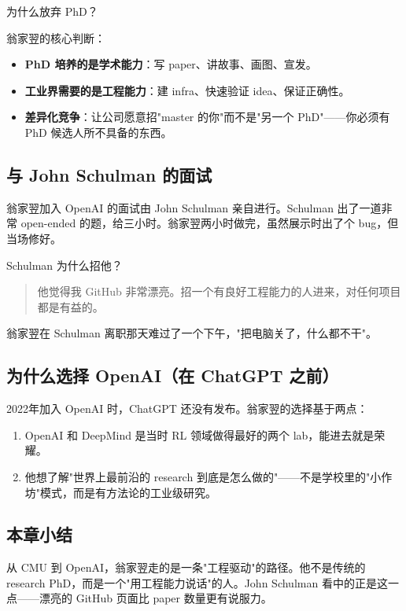 \documentclass[a4paper]{article}
\begin{document}
\begin{knowledgebox}{为什么放弃 PhD？}

翁家翌的核心判断：
\begin{itemize}
\item \textbf{PhD 培养的是学术能力}：写 paper、讲故事、画图、宣发。
\item \textbf{工业界需要的是工程能力}：建 infra、快速验证 idea、保证正确性。
\item \textbf{差异化竞争}：让公司愿意招"master 的你"而不是"另一个 PhD"——你必须有 PhD 候选人所不具备的东西。
\end{itemize}
\end{knowledgebox}


\subsection{与 John Schulman 的面试}

翁家翌加入 OpenAI 的面试由 John Schulman 亲自进行。Schulman 出了一道非常 open-ended 的题，给三小时。翁家翌两小时做完，虽然展示时出了个 bug，但当场修好。

Schulman 为什么招他？

\begin{quote}
他觉得我 GitHub 非常漂亮。招一个有良好工程能力的人进来，对任何项目都是有益的。
\end{quote}

翁家翌在 Schulman 离职那天难过了一个下午，"把电脑关了，什么都不干"。

\subsection{为什么选择 OpenAI（在 ChatGPT 之前）}

2022年加入 OpenAI 时，ChatGPT 还没有发布。翁家翌的选择基于两点：

\begin{enumerate}
\item OpenAI 和 DeepMind 是当时 RL 领域做得最好的两个 lab，能进去就是荣耀。
\item 他想了解"世界上最前沿的 research 到底是怎么做的"——不是学校里的"小作坊"模式，而是有方法论的工业级研究。
\end{enumerate}

\subsection{本章小结}
从 CMU 到 OpenAI，翁家翌走的是一条"工程驱动"的路径。他不是传统的 research PhD，而是一个"用工程能力说话"的人。John Schulman 看中的正是这一点——漂亮的 GitHub 页面比 paper 数量更有说服力。
\end{document}

